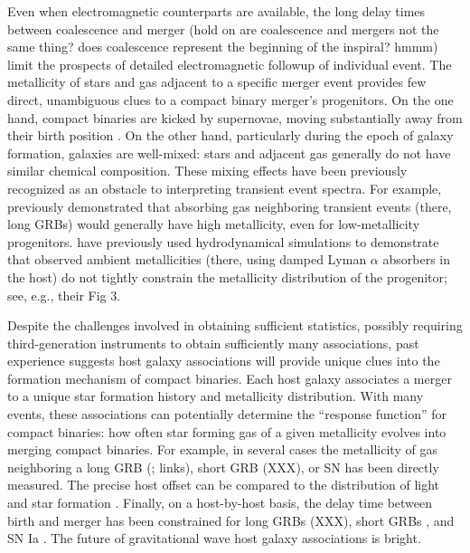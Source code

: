 \documentclass[nofootinbib,twocolumn,prd]{emulateapj}
\newcommand\editremark[1]{{\color{red}#1}}
\newcommand\jillianremark[1]{{\color{blue}#1}}
\begin{document}
Even when electromagnetic counterparts are available, the long delay times between coalescence and merger \jillianremark{(hold on are coalescence and mergers not the same thing?  does coalescence represent the beginning of the inspiral?  hmmm)} limit
the prospects of detailed electromagnetic followup of individual event. 
The metallicity of stars and gas adjacent to a specific merger event provides
few direct, unambiguous clues to a compact binary merger's progenitors.  
On the one hand, compact binaries are kicked by supernovae, moving substantially away from their birth position
\cite{2013ApJ...776...18F,2014ARAA..52...43B}. 
On the other hand, particularly during the epoch of galaxy formation, galaxies are well-mixed: stars and adjacent gas generally do not have
similar chemical composition.  
These mixing effects have been previously recognized as an obstacle to interpreting transient event spectra.  For
example,   \cite{2010MNRAS.402.1523P} previously demonstrated that absorbing gas neighboring transient events (there, long GRBs)
would generally have high metallicity, even for low-metallicity progenitors.   
%
\citet{2010MNRAS.402.1523P} have previously used hydrodynamical simulations to demonstrate that observed ambient
metallicities (there, using damped Lyman $\alpha$ absorbers in the host) do not tightly constrain the metallicity
distribution of the progenitor; see, e.g., their Fig 3.
%


Despite the challenges involved in obtaining sufficient statistics, possibly requiring third-generation instruments to
obtain sufficiently many associations, past experience suggests  host galaxy associations
will provide unique clues into the formation mechanism of compact binaries.
% 
Each host galaxy associates a merger to a unique star formation history and metallicity distribution.
With many events, these associations can potentially determine the ``response function'' for compact binaries: how often star forming gas of a given metallicity evolves into
merging compact binaries.    
%
For example, in several cases the metallicity of gas neighboring a long GRB (\citet{ 2008AJ....135.1136M}; \citet{2010AJ....140.1557L}
\editremark{links}), short GRB (\editremark{XXX}), or SN has been directly measured.
%
The precise host offset can be compared to the distribution of light and star formation  \citep{2010ApJ...708....9F}.
%
Finally,  on a host-by-host basis, the delay time between birth and merger has been constrained for long GRBs (\editremark{XXX}), short GRBs \citep{2010ApJ...725.1202L}, and
  SN Ia \citep{2011MNRAS.412.1508M}.  
%
The future of gravitational wave host galaxy associations is bright.
\end{document}
